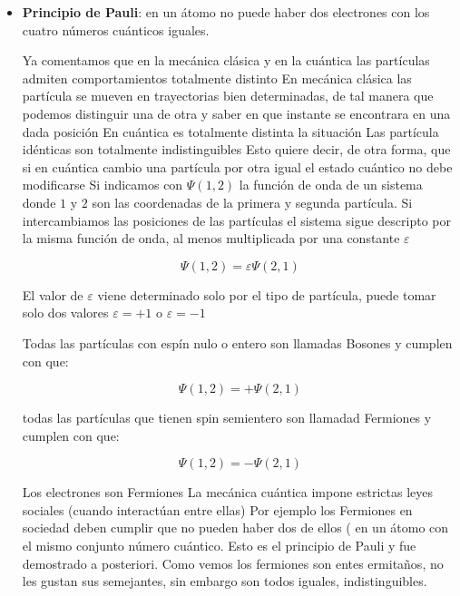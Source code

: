\begin{itemize}
	\item \textbf{Principio de Pauli}: en un átomo no puede haber dos electrones con los cuatro números cuánticos iguales.
	
Ya comentamos que en la mecánica clásica y en la cuántica las partículas admiten comportamientos
totalmente distinto En mecánica clásica las partícula se mueven en trayectorias bien determinadas, de
tal manera que podemos distinguir una de otra y saber en que instante se encontrara en una dada
posición En cuántica es totalmente distinta la situación Las partícula idénticas son totalmente
indistinguibles Esto quiere decir, de otra forma, que si en cuántica cambio una partícula por otra igual el estado cuántico no debe modificarse Si indicamos con $\Psi(1,2)$ la función de onda de un sistema donde $1$ y $2$ son las coordenadas de la primera y segunda partícula. Si intercambiamos las posiciones de las partículas el sistema sigue descripto por la misma función de onda, al menos multiplicada por una constante $\varepsilon$

\begin{equation*}
	\Psi(1,2)=\varepsilon\Psi(2,1)
\end{equation*}

El valor de $\varepsilon$ viene determinado solo por el tipo de partícula, puede tomar solo dos valores $\varepsilon=+1$ o $\varepsilon=-1$ 

Todas las partículas con espín nulo o entero son llamadas Bosones y cumplen con que:

\begin{equation*}
	\Psi(1,2)=+\Psi(2,1)
\end{equation*}


todas las partículas que tienen spin semientero son llamadad Fermiones y cumplen con que:

\begin{equation*}
	\Psi(1,2)=-\Psi(2,1)
\end{equation*}

Los electrones son Fermiones La mecánica cuántica impone estrictas leyes sociales (cuando interactúan entre ellas) Por ejemplo los Fermiones en sociedad deben cumplir que no pueden haber dos de ellos ( en un átomo con el mismo conjunto número cuántico. Esto es el principio de Pauli y fue demostrado a posteriori. Como vemos los fermiones son entes ermitaños, no les gustan sus semejantes, sin embargo son todos iguales, indistinguibles.	
	

\end{itemize}
